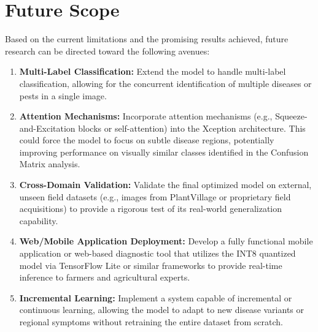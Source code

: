\documentclass[12pt, a4paper]{report}
\begin{document}
\section{Future Scope}
\label{sec:future_scope}
\noindent
Based on the current limitations and the promising results achieved, future research can be directed toward the following avenues:
\begin{enumerate}
    \item \textbf{Multi-Label Classification:} Extend the model to handle multi-label classification, allowing for the concurrent identification of multiple diseases or pests in a single image.
    \item \textbf{Attention Mechanisms:} Incorporate attention mechanisms (e.g., Squeeze-and-Excitation blocks or self-attention) into the Xception architecture. This could force the model to focus on subtle disease regions, potentially improving performance on visually similar classes identified in the Confusion Matrix analysis.
    \item \textbf{Cross-Domain Validation:} Validate the final optimized model on external, unseen field datasets (e.g., images from PlantVillage or proprietary field acquisitions) to provide a rigorous test of its real-world generalization capability.
    \item \textbf{Web/Mobile Application Deployment:} Develop a fully functional mobile application or web-based diagnostic tool that utilizes the INT8 quantized model via TensorFlow Lite or similar frameworks to provide real-time inference to farmers and agricultural experts.
    \item \textbf{Incremental Learning:} Implement a system capable of incremental or continuous learning, allowing the model to adapt to new disease variants or regional symptoms without retraining the entire dataset from scratch.
\end{enumerate}
\end{document}
